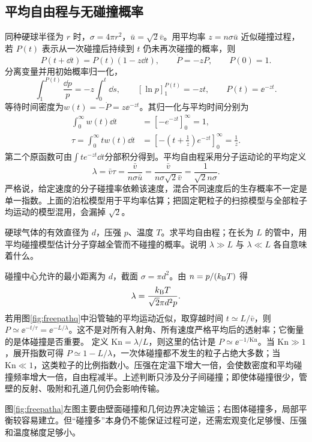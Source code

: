 \subsection{平均自由程与无碰撞概率}
\label{th:collisions}
同种硬球半径为 $r$ 时，$\sigma=4\pi r^2$，$\bar u=\sqrt2\bar v$。用平均率 $z=n\sigma\bar u$ 近似碰撞过程，若 $P(t)$ 表示从一次碰撞后持续到 $t$ 仍未再次碰撞的概率，则
\[
 P(t+\dd t)=P(t)(1-z\dd t),\qquad
 \dot P=-zP,\qquad P(0)=1.
\]
分离变量并用初始概率归一化，
\[\int_1^{P(t)}\frac{\dd p}{p}=-z\int_0^t\dd s,
\qquad[\ln p]_1^{P(t)}=-zt,\qquad P(t)=\ee^{-zt}.\]
等待时间密度为$w(t)=-\dot P=z\ee^{-zt}$。其归一化与平均时间分别为
\[\begin{aligned}
\int_0^\infty w(t)\dd t&=[-e^{-zt}]_0^\infty=1,\\
\tau=\int_0^\infty tw(t)\dd t
&=\left[-\left(t+\frac1z\right)e^{-zt}\right]_0^\infty=\frac1z.
\end{aligned}\]
第二个原函数可由$\int t e^{-zt}\dd t$分部积分得到。平均自由程采用分子运动论的平均定义
\begin{equation}
 \lambda=\bar v\tau=\frac{\bar v}{n\sigma\bar u}
=\frac{\bar v}{n\sigma\sqrt2\bar v}=\frac1{\sqrt2n\sigma}.
\end{equation}
严格说，给定速度的分子碰撞率依赖该速度，混合不同速度后的生存概率不一定是单一指数。上面的泊松模型用于平均率估算；把固定靶粒子的扫掠模型与全部粒子均运动的模型混用，会漏掉 $\sqrt2$。

\begin{example}[自由程与稀薄程度]\label{ex:freepath}
硬球气体的有效直径为 $d$，压强 $p$、温度 $T$。求平均自由程；在长为 $L$ 的管中，用平均碰撞模型估计分子穿越全管而不碰撞的概率。说明 $\lambda\gg L$ 与 $\lambda\ll L$ 各自意味着什么。
\end{example}
\begin{solution}
碰撞中心允许的最小距离为 $d$，截面 $\sigma=\pi d^2$。由 $n=p/(k_{\mathrm B} T)$ 得
\[
 \lambda=\frac{k_{\mathrm B} T}{\sqrt2\pi d^2p}.
\]
若用图\ref{fig:freepathq}中沿管轴的平均运动近似，取穿越时间 $t\simeq L/\bar v$，则 $P\simeq\ee^{-t/\tau}=\ee^{-L/\lambda}$。这不是对所有入射角、所有速度严格平均后的透射率；它衡量的是体碰撞是否重要。
定义 $\mathrm{Kn}=\lambda/L$，则这里的估计是 $P\simeq\ee^{-1/\mathrm{Kn}}$。当 $\mathrm{Kn}\gg1$，展开指数可得 $P\simeq1-L/\lambda$，一次体碰撞都不发生的粒子占绝大多数；当 $\mathrm{Kn}\ll1$，这类粒子的比例指数小。压强在定温下增大一倍，会使数密度和平均碰撞频率增大一倍，自由程减半。上述判断只涉及分子间碰撞；即使体碰撞很少，管壁的反射、吸附和孔道几何仍会影响传输。

图\ref{fig:freepatha}左图主要由壁面碰撞和几何边界决定输运；右图体碰撞多，局部平衡较容易建立。但“碰撞多”本身仍不能保证过程可逆，还需宏观变化足够慢、压强和温度梯度足够小。
\end{solution}

